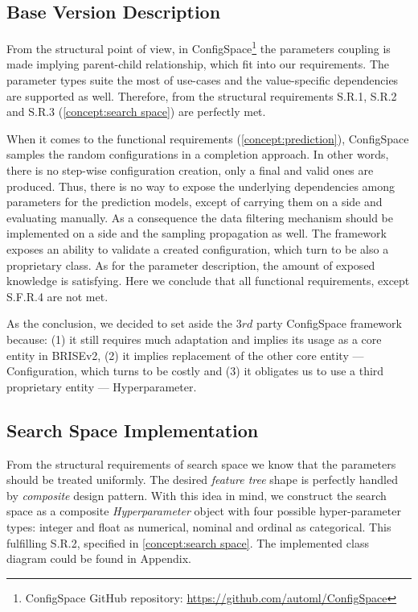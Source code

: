 \subsection{Base Version Description}
From the structural point of view, in ConfigSpace\footnote{ConfigSpace GitHub repository: \url{https://github.com/automl/ConfigSpace}} the parameters coupling is made implying parent-child relationship, which fit into our requirements. The parameter types suite the most of use-cases and the value-specific dependencies are supported as well. Therefore, from the structural requirements S.R.1, S.R.2 and S.R.3 (\cref{concept:search space}) are perfectly met.

When it comes to the functional requirements (\cref{concept:prediction}), ConfigSpace samples the random configurations in a completion approach. In other words, there is no step-wise configuration creation, only a final and valid ones are produced. Thus, there is no way to expose the underlying dependencies among parameters for the prediction models, except of carrying them on a side and evaluating manually. As a consequence the data filtering mechanism should be implemented on a side and the sampling propagation as well. The framework exposes an ability to validate a created configuration, which turn to be also a proprietary class. As for the parameter description, the amount of exposed knowledge is satisfying. Here we conclude that all functional requirements, except S.F.R.4 are not met.

As the conclusion, we decided to set aside the $3rd$ party ConfigSpace framework because: (1) it still requires much adaptation and implies its usage as a core entity in BRISEv2, (2) it implies replacement of the other core entity — Configuration, which turns to be costly and (3) it obligates us to use a third proprietary entity — Hyperparameter. 

\subsection{Search Space Implementation}\label{impl: search space impl}
From the structural requirements of search space we know that the parameters should be treated uniformly. The desired \emph{feature tree} shape is perfectly handled by \emph{composite} design pattern. With this idea in mind, we construct the search space as a composite \emph{Hyperparameter} object with four possible hyper-parameter types: integer and float as numerical, nominal and ordinal as categorical. This fulfilling S.R.2, specified in \cref{concept:search space}. The implemented class diagram could be found in Appendix.

